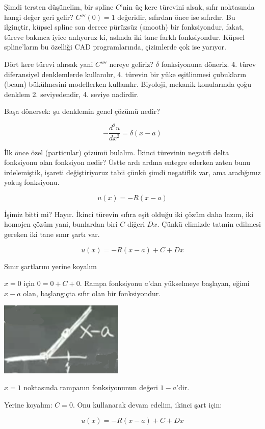 \documentclass[12pt,fleqn]{article}\usepackage{../../common}
\begin{document}
Şimdi tersten düşünelim, bir spline $C$'nin üç kere türevini alsak, sıfır
noktasında hangi değer geri gelir? $C'''(0) = 1$ değeridir, sıfırdan önce
ise sıfırdır. Bu ilginçtir, küpsel spline son derece pürüzsüz (smooth) bir
fonksiyondur, fakat, türeve bakınca iyice anlıyoruz ki, aslında iki tane
farklı fonksiyondur. Küpsel spline'ların bu özelliği CAD programlarında,
çizimlerde çok ise yarıyor.

Dört kere türevi alırsak yani $C''''$ nereye geliriz? $\delta$ fonksiyonuna
döneriz. 4. türev diferansiyel denklemlerde kullanılır, 4. türevin bir yüke
eşitlinmesi çubukların (beam) bükülmesini modellerken kullanılır. Biyoloji,
mekanik konularında çoğu denklem 2. seviyedendir, 4. seviye nadirdir. 

Başa dönersek: şu denklemin genel çözümü nedir?

$$ -\frac{d^2u}{dx^2}=\delta(x-a) $$

İlk önce özel (particular) çözümü bulalım. İkinci türevinin negatifi delta
fonksiyonu olan fonksiyon nedir? Üstte ardı ardına entegre ederken zaten bunu
irdelemiştik, işareti değiştiriyoruz tabii çünkü şimdi negatiflik var, ama
aradığımız yokuş fonksiyonu.

$$ u(x) = -R(x-a) $$

İşimiz bitti mi? Hayır. İkinci türevin sıfıra eşit olduğu iki çözüm daha
lazım, iki homojen çözüm yani, bunlardan biri $C$ diğeri $Dx$. Çünkü
elimizde tatmin edilmesi gereken iki tane sınır şartı var. 

$$ u(x) = -R(x-a) + C + Dx$$

Sınır şartlarını yerine koyalım

$x=0$ için $0 = 0 + C + 0$. Rampa fonksiyonu $a$'dan yükselmeye başlayan,
eğimi $x-a$ olan, başlangıçta sıfır olan bir fonksiyondur. 

\includegraphics[height=3.5cm]{4_10.png}

$x=1$ noktasında rampanın fonksiyonunun değeri $1-a$'dir. 

Yerine koyalım: $C = 0$. Onu kullanarak devam edelim, ikinci şart için:

$$ u(x) = -R(x-a) + C + Dx $$
\end{document}
